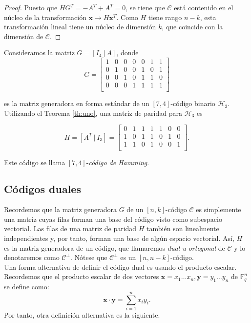 \begin{proof}
Puesto que $HG^T = -A^T + A^T = 0$, se tiene que $\mathcal{C}$ está contenido en el núcleo de la transformación $\mathbf{x} \rightarrow H\mathbf{x}^T$. Como $H$ tiene rango $n-k$, esta transformación lineal tiene un núcleo de dimensión $k$, que coincide con la dimensión de $\mathcal{C}$. 
\end{proof}

\begin{ejemplo}\label{ej:1.6}
Consideramos la matriz $  G = \left[ I_4 \ \vert \ A \right] $, donde
$$ G = \left[\begin{array}{cccc|ccc}
1&0&0&0&0&1&1\\
0&1&0&0&1&0&1\\
0&0&1&0&1&1&0\\
0&0&0&1&1&1&1\\
\end{array}\right]
$$

es la matriz generadora en forma estándar de un $[7,4]$-código binario $\mathcal{H}_3$. Utilizando el Teorema \ref{th:uno}, una matriz de paridad para $\mathcal{H}_3$ es

$$H = [A^T \ \vert \ I_3] =  \left[\begin{array}{cccc|ccc}
0&1&1&1&1&0&0\\
1&0&1&1&0&1&0\\
1&1&0&1&0&0&1\\
\end{array}\right]. $$

Este código se llama $[7,4]$-\emph{código de Hamming}.

\end{ejemplo}

\subsection{Códigos duales}\label{sec:1.2}

Recordemos que la matriz generadora $G$ de un $[n,k]$-código $\mathcal{C}$ es simplemente una matriz cuyas filas forman una base del código visto como subespacio vectorial. Las filas de una matriz de paridad $H$ también son linealmente independientes y, por tanto, forman una base de algún espacio vectorial. Así, $H$ es la matriz generadora de un código, que llamaremos \emph{ dual u ortogonal} de $\mathcal{C}$ y lo denotaremos como $\mathcal{C}^{\bot}$. Nótese que $\mathcal{C}^{\bot}$ es un $[n,n-k]$-código. 
\\
Una forma alternativa de definir el código dual es usando el producto escalar. Recordemos que el producto escalar de dos vectores $\mathbf{x} = x_1\dots x_n, \mathbf{y} = y_1\dots y_n$ de $\mathds{F}_{q}^{n}$ se define como: $$\mathbf{x} \cdot \mathbf{y} = \sum_{i=1}^{n} x_iy_i.$$ Por tanto, otra definición alternativa es la siguiente.

